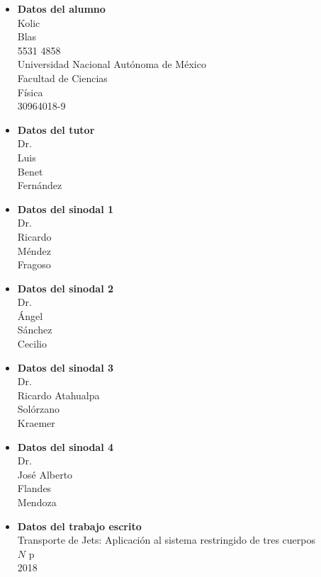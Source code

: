 \begin{itemize}

\item \textbf{Datos del alumno} \\ Kolic \\ Blas \\ 5531 4858 \\ Universidad Nacional Autónoma de México \\ Facultad de Ciencias \\ Física \\ 30964018-9

\item \textbf{Datos del tutor} \\ Dr. \\ Luis \\ Benet \\ Fernández

\item \textbf{Datos del sinodal 1} \\ Dr. \\ Ricardo \\ Méndez \\ Fragoso

\item \textbf{Datos del sinodal 2} \\ Dr. \\ Ángel \\ Sánchez \\ Cecilio

\item \textbf{Datos del sinodal 3} \\ Dr. \\ Ricardo Atahualpa \\ Solórzano \\ Kraemer

\item \textbf{Datos del sinodal 4} \\ Dr. \\ José Alberto \\ Flandes \\ Mendoza

\item \textbf{Datos del trabajo escrito} \\ Transporte de Jets: Aplicación al sistema restringido de tres cuerpos \\ $N$ p \\ 2018

\end{itemize}